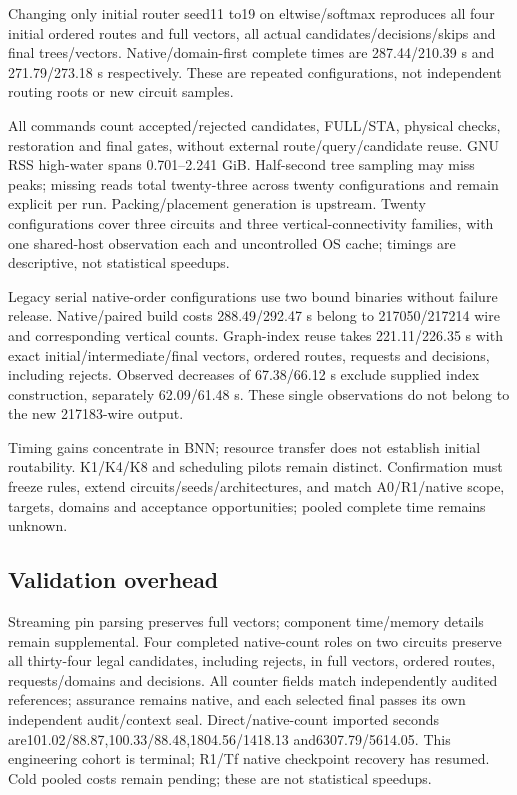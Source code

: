 \documentclass[conference,10pt]{IEEEtran}
\begin{document}
Changing only initial router seed11 to19 on eltwise/softmax reproduces all four initial ordered routes and full vectors, all actual candidates/decisions/skips and final trees/vectors. Native/domain-first complete times are 287.44/210.39 s and 271.79/273.18 s respectively. These are repeated configurations, not independent routing roots or new circuit samples.

All commands count accepted/rejected candidates, FULL/STA, physical checks, restoration and final gates, without external route/query/candidate reuse. GNU RSS high-water spans 0.701--2.241 GiB. Half-second tree sampling may miss peaks; missing reads total twenty-three across twenty configurations and remain explicit per run. Packing/placement generation is upstream. Twenty configurations cover three circuits and three vertical-connectivity families, with one shared-host observation each and uncontrolled OS cache; timings are descriptive, not statistical speedups.

Legacy serial native-order configurations use two bound binaries without failure release. Native/paired build costs 288.49/292.47 s belong to 217050/217214 wire and corresponding vertical counts. Graph-index reuse takes 221.11/226.35 s with exact initial/intermediate/final vectors, ordered routes, requests and decisions, including rejects. Observed decreases of 67.38/66.12 s exclude supplied index construction, separately 62.09/61.48 s. These single observations do not belong to the new 217183-wire output.

Timing gains concentrate in BNN; resource transfer does not establish initial routability. K1/K4/K8 and scheduling pilots remain distinct. Confirmation must freeze rules, extend circuits/seeds/architectures, and match A0/R1/native scope, targets, domains and acceptance opportunities; pooled complete time remains unknown.

\subsection{Validation overhead}
Streaming pin parsing preserves full vectors; component time/memory details remain supplemental. Four completed native-count roles on two circuits preserve all thirty-four legal candidates, including rejects, in full vectors, ordered routes, requests/domains and decisions. All counter fields match independently audited references; assurance remains native, and each selected final passes its own independent audit/context seal. Direct/native-count imported seconds are101.02/88.87,100.33/88.48,1804.56/1418.13 and6307.79/5614.05. This engineering cohort is terminal; R1/Tf native checkpoint recovery has resumed. Cold pooled costs remain pending; these are not statistical speedups.
\end{document}
